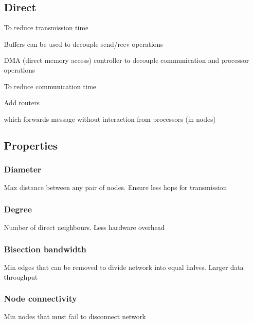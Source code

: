 \documentclass[12pt]{article}
\begin{document}
\begin{spacing}{1.5}
\subsection{Direct}

To reduce transmission time

\begin{itemize*}
	\item Buffers can be used to decouple send/recv operations
	\item DMA (direct memory access) controller to decouple communication and processor operations
\end{itemize*}

To reduce communication time

\begin{itemize*}
	\item Add routers
	\item which forwards message without interaction from processors (in nodes)
\end{itemize*}

\subsection{Properties}

\subsubsection{Diameter}

Max distance between any pair of nodes. Ensure less hops for transmission

\subsubsection{Degree}

Number of direct neighbours. Less hardware overhead

\subsubsection{Bisection bandwidth}

Min edges that can be removed to divide network into equal halves. Larger data throughput

\subsubsection{Node connectivity}

Min nodes that must fail to disconnect network


\end{spacing}
\end{document}
